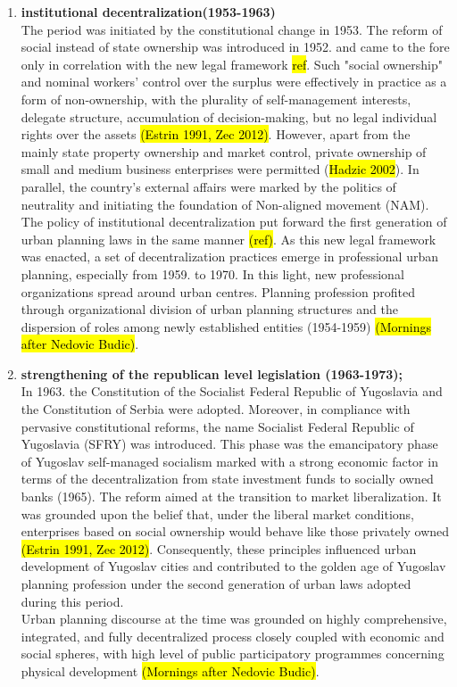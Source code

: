\documentclass[11pt]{report}
\begin{document}
\begin{enumerate}
\item  \textbf{institutional decentralization(1953-1963)}
\\
The period was initiated by the constitutional change in 1953.
The reform of social instead of state ownership was introduced in 1952. and came to the fore only in correlation with the new legal framework \hl{ref}.
Such "social ownership" and nominal workers' control over the surplus were effectively in practice as a form of non-ownership, with the plurality of self-management interests, delegate structure, accumulation of decision-making, but no legal individual rights over the assets \hl{(Estrin 1991, Zec 2012)}.
However, apart from the mainly state property ownership and market control, private ownership of small and medium business enterprises were permitted (\hl{Hadzic 2002}).
In parallel, the country's external affairs were marked by the politics of neutrality and initiating the foundation of Non-aligned movement (NAM).
The policy of institutional decentralization put forward the first generation of urban planning laws in the same manner \hl{(ref)}.
As this new legal framework was enacted, a set of decentralization practices emerge in professional urban planning, especially from 1959. to 1970.
In this light, new professional organizations spread around urban centres.
Planning profession profited through organizational division of urban planning structures and the dispersion of roles among newly established entities (1954-1959) \hl{(Mornings after Nedovic Budic)}. 

\item  \textbf{strengthening of the republican level legislation (1963-1973);}
\\
In 1963. the Constitution of the Socialist Federal Republic of Yugoslavia  and the Constitution of Serbia were adopted.
Moreover, in compliance with pervasive constitutional reforms, the name Socialist Federal Republic of Yugoslavia (SFRY) was introduced.
This phase was the emancipatory phase of Yugoslav self-managed socialism marked with a strong economic factor in terms of the decentralization from state investment  funds  to  socially  owned  banks (1965).
The reform aimed at the transition to market liberalization.
It was grounded upon the belief that, under the liberal market conditions, enterprises based on social ownership would behave like those privately owned \hl{(Estrin 1991, Zec 2012)}.
Consequently, these principles influenced urban development of Yugoslav cities and contributed to the golden age of Yugoslav planning profession under the second generation of urban laws adopted during this period.
\\
Urban planning discourse at the time was grounded on highly comprehensive, integrated, and fully decentralized process closely coupled with economic and social spheres, with high level of public participatory programmes concerning physical development \hl{(Mornings after Nedovic Budic)}.


\end{enumerate}
\end{document}
